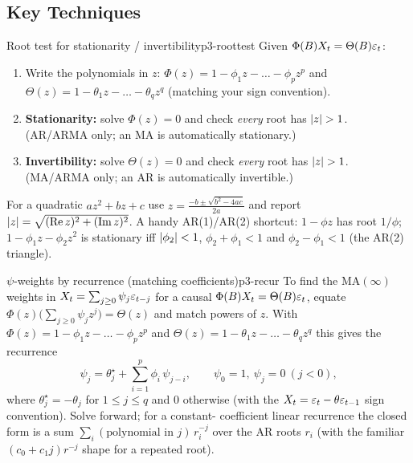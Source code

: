 \subsection{Key Techniques}

\begin{keytech}{Root test for stationarity / invertibility}{p3-roottest}
Given $\Phi(B)X_t=\Theta(B)\varepsilon_t$:
\begin{enumerate}
  \item Write the polynomials in $z$: $\Phi(z)=1-\phi_1 z-\dots-\phi_p z^p$ and
        $\Theta(z)=1-\theta_1 z-\dots-\theta_q z^q$ (matching your sign
        convention).
  \item \textbf{Stationarity:} solve $\Phi(z)=0$ and check \emph{every} root has
        $\left\lvert z \right\rvert>1$. (AR/ARMA only; an MA is automatically stationary.)
  \item \textbf{Invertibility:} solve $\Theta(z)=0$ and check \emph{every} root
        has $\left\lvert z \right\rvert>1$. (MA/ARMA only; an AR is automatically invertible.)
\end{enumerate}
For a quadratic $a z^2+bz+c$ use $z=\frac{-b\pm\sqrt{b^2-4ac}}{2a}$ and report
$\left\lvert z \right\rvert=\sqrt{(\mathrm{Re}\,z)^2+(\mathrm{Im}\,z)^2}$. A handy AR(1)/AR(2)
shortcut: $1-\phi z$ has root $1/\phi$; $1-\phi_1 z-\phi_2 z^2$ is stationary iff
$\left\lvert \phi_2 \right\rvert<1$, $\phi_2+\phi_1<1$ and $\phi_2-\phi_1<1$ (the AR(2) triangle).
\end{keytech}

\begin{keytech}{$\psi$-weights by recurrence (matching coefficients)}{p3-recur}
To find the $\mathrm{MA}(\infty)$ weights in $X_t=\sum_{j\ge0}\psi_j\varepsilon_{t-j}$
for a causal $\Phi(B)X_t=\Theta(B)\varepsilon_t$, equate
$\Phi(z)\big(\sum_{j\ge0}\psi_j z^j\big)=\Theta(z)$ and match powers of $z$.
With $\Phi(z)=1-\phi_1 z-\dots-\phi_p z^p$ and
$\Theta(z)=1-\theta_1 z-\dots-\theta_q z^q$ this gives the recurrence
\[
\psi_j=\theta_j^{\star}+\sum_{i=1}^{p}\phi_i\,\psi_{j-i},
\qquad \psi_0=1,\ \psi_j=0\ (j<0),
\]
where $\theta_j^{\star}=-\theta_j$ for $1\le j\le q$ and $0$ otherwise (with the
$X_t=\varepsilon_t-\theta\varepsilon_{t-1}$ sign convention). Solve forward; for a constant-
coefficient linear recurrence the closed form is a sum
$\sum_i (\text{polynomial in }j)\,r_i^{-j}$ over the AR roots $r_i$ (with the
familiar $(c_0+c_1 j)r^{-j}$ shape for a repeated root).
\end{keytech}

